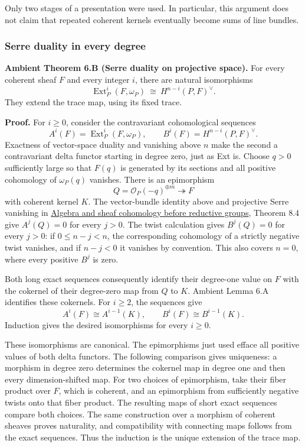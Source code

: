 \documentclass[11pt,a4paper,openany]{report}
\begin{document}
Only two stages of a presentation were used. In particular, this argument does not claim that repeated coherent kernels eventually become sums of line bundles.

\subsubsection{Serre duality in every degree}\label{AG-RG-S02-serre-duality-in-every-degree}

\textbf{Ambient Theorem 6.B (Serre duality on projective space).} For every coherent sheaf \(F\) and every integer \(i\), there are natural isomorphisms \[
\operatorname{Ext}^i_P(F,\omega_P)
 \ \cong\ H^{n-i}(P,F)^\vee.
\] They extend the trace map, using its fixed trace.

\textbf{Proof.} For \(i\geq0\), consider the contravariant cohomological sequences \[
A^i(F)=\operatorname{Ext}^i_P(F,\omega_P),
\qquad B^i(F)=H^{n-i}(P,F)^\vee.
\] Exactness of vector-space duality and vanishing above \(n\) make the second a contravariant delta functor starting in degree zero, just as Ext is. Choose \(q>0\) sufficiently large so that \(F(q)\) is generated by its sections and all positive cohomology of \(\omega_P(q)\) vanishes. There is an epimorphism \[
Q=\mathcal O_P(-q)^{\oplus m}\twoheadrightarrow F
\] with coherent kernel \(K\). The vector-bundle identity above and projective Serre vanishing in \href{https://github.com/KokunoYumeto/open-math-courses/blob/main/docs/courses/AG-RG/AG-RG-S01.md}{Algebra and sheaf cohomology before reductive groups}, Theorem 8.4 give \(A^j(Q)=0\) for every \(j>0\). The twist calculation gives \(B^j(Q)=0\) for every \(j>0\): if \(0\leq n-j<n\), the corresponding cohomology of a strictly negative twist vanishes, and if \(n-j<0\) it vanishes by convention. This also covers \(n=0\), where every positive \(B^j\) is zero.

Both long exact sequences consequently identify their degree-one value on \(F\) with the cokernel of their degree-zero map from \(Q\) to \(K\). Ambient Lemma 6.A identifies these cokernels. For \(i\geq2\), the sequences give \[
A^i(F)\cong A^{i-1}(K),
\qquad B^i(F)\cong B^{i-1}(K).
\] Induction gives the desired isomorphisms for every \(i\geq0\).

These isomorphisms are canonical. The epimorphisms just used efface all positive values of both delta functors. The following comparison gives uniqueness: a morphism in degree zero determines the cokernel map in degree one and then every dimension-shifted map. For two choices of epimorphism, take their fiber product over \(F\), which is coherent, and an epimorphism from sufficiently negative twists onto that fiber product. The resulting maps of short exact sequences compare both choices. The same construction over a morphism of coherent sheaves proves naturality, and compatibility with connecting maps follows from the exact sequences. Thus the induction is the unique extension of the trace map.
\end{document}

